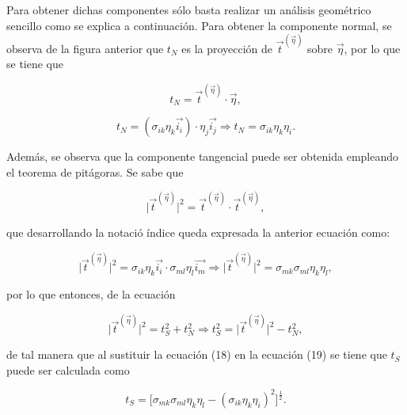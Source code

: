 \documentclass{article}
\begin{document}
    Para obtener dichas componentes s\'{o}lo basta
    realizar un an\'{a}lisis geom\'{e}trico sencillo como se explica a continuaci\'{o}n.
    Para obtener la componente normal, se observa de la figura anterior que $t_{N}$ es la
    proyecci\'{o}n de $\vec{t}^{(\vec{\eta})}$ sobre $\vec{\eta}$, por lo que se tiene que

    \begin{equation}
        t_{N} = \vec{t}^{(\vec{\eta})} \cdot \vec{\eta},
    \end{equation}

    \begin{equation}
        t_{N} = (\sigma_{ik}\eta_{k}\vec{i_{i}})\cdot\eta_{j}\vec{i_{j}}
        \Longrightarrow
        t_{N} = \sigma_{ik}\eta_{k}\eta_{i}.
    \end{equation}

    Adem\'{a}s, se observa que la componente tangencial puede ser obtenida empleando el
    teorema de pit\'{a}goras. Se sabe que

    \begin{equation}
        \lvert \vec{t}^{(\vec{\eta})} \rvert^2 = \vec{t}^{(\vec{\eta})} \cdot \vec{t}^{(\vec{\eta})},
    \end{equation}
    
    que desarrollando la notaci\'{o} \'{i}ndice queda expresada la anterior ecuaci\'{o}n como:

    \begin{equation}
        \lvert \vec{t}^{(\vec{\eta})} \rvert^2 = \sigma_{ik}\eta_{k}\vec{i_{i}} \cdot
        \sigma_{ml}\eta_{l}\vec{i_{m}} \Rightarrow
        \lvert \vec{t}^{(\vec{\eta})} \rvert^2 = \sigma_{mk}\sigma_{ml}\eta_{k}\eta_{l},
    \end{equation}

    por lo que entonces, de la ecuaci\'{o}n

    \begin{equation}
        \lvert \vec{t}^{(\vec{\eta})} \rvert^2 = t_{S}^2 + t_{N}^2
        \Rightarrow
        t_{S}^2 = \lvert \vec{t}^{(\vec{\eta})} \rvert^2 - t_{N}^2,
    \end{equation}

    de tal manera que al sustituir la ecuaci\'{o}n (18) en la ecuaci\'{o}n (19) se tiene que 
    $t_{S}$ puede ser calculada como

    \begin{equation}
        t_{S} = \lbrack
            \sigma_{mk}\sigma_{ml}\eta_{k}\eta_{l} 
            - (\sigma_{ik}\eta_{k}\eta_{i})^2 
        \rbrack^\frac{1}{2}.
    \end{equation}
\end{document}
